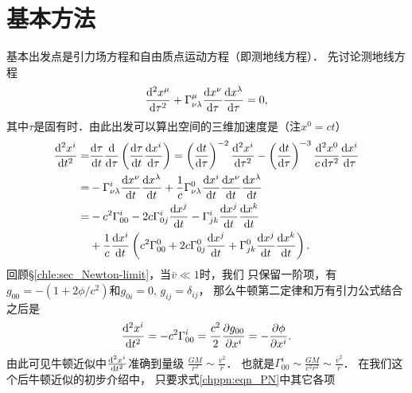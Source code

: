 \section{基本方法}
基本出发点是引力场方程和自由质点运动方程（即测地线方程）．
先讨论测地线方程
\begin{equation}
    \frac{{\rm d}^2 x^\mu}{{\rm d}\tau ^2}+ {\Gamma}_{\nu\lambda}^{\mu}
      \frac{{\rm d} x^\nu}{{\rm d}\tau} \frac{{\rm d} x^\lambda}{{\rm d}\tau} =0,
\end{equation}
其中$\tau$是固有时．由此出发可以算出空间的三维加速度是（注$x^0=ct$）
\begin{align}
    \frac{{\rm d}^2 x^i}{{\rm d} t^2} =& \frac{{\rm d} \tau}{{\rm d}t}
       \frac{{\rm d} }{{\rm d}\tau} \left( \frac{{\rm d} \tau}{{\rm d}t}
       \frac{{\rm d} x^i}{{\rm d} \tau} \right)
    =\left(\frac{{\rm d} t}{{\rm d}\tau} \right)^{-2} \frac{{\rm d}^2 x^i}{{\rm d} \tau^2}
     -\left(\frac{{\rm d} t}{{\rm d}\tau} \right)^{-3}
     \frac{{\rm d}^2 x^0}{c\, {\rm d} \tau^2} \frac{{\rm d} x^i}{{\rm d} \tau}  \notag \\
    =&-{\Gamma}_{\nu\lambda}^{i} \frac{{\rm d} x^\nu}{{\rm d}t} \frac{{\rm d} x^\lambda}{{\rm d}t}
      +\frac{1}{c} {\Gamma}_{\nu\lambda}^{0} \frac{{\rm d} x^i}{{\rm d}t}
       \frac{{\rm d} x^\nu}{{\rm d}t} \frac{{\rm d} x^\lambda}{{\rm d}t} \notag \\
    =& -c^2 \Gamma_{00}^{i} - 2c \Gamma_{0j}^{i}\frac{{\rm d} x^j}{{\rm d}t}
       -\Gamma_{jk}^{i} \frac{{\rm d} x^j}{{\rm d}t} \frac{{\rm d} x^k}{{\rm d}t} \notag \\
      & +\frac{1}{c}\frac{{\rm d} x^i}{{\rm d}t} \left(
        c^2 \Gamma_{00}^{0} + 2c \Gamma_{0j}^{0}\frac{{\rm d} x^j}{{\rm d}t}
       +\Gamma_{jk}^{0} \frac{{\rm d} x^j}{{\rm d}t}
       \frac{{\rm d} x^k}{{\rm d}t}  \right) . \label{chppn:eqn_PN}
\end{align}
回顾\S\ref{chle:sec_Newton-limit}，当$\bar{v} \ll 1$时，我们
只保留一阶项，有$g_{00}=-(1+ 2\phi/c^2)$和$g_{0i}=0,\, g_{ij}=\delta_{ij}$，
那么牛顿第二定律和万有引力公式结合之后是
\begin{equation}
    \frac{{\rm d}^2 x^i}{{\rm d}t^2}=-c^2{\Gamma}_{00}^i
    =\frac{c^2}{2} \frac{\partial g_{00}}{\partial x^i}
    =-\frac{\partial \phi}{\partial x^i} .
\end{equation}
由此可见牛顿近似中$\frac{{\rm d}^2 x^i}{{\rm d}t^2}$准确到量级
$\frac{G M}{r^2} \sim \frac{v^2}{r}$．
也就是$\Gamma_{00}^i\sim \frac{G M}{c^2 r^2} \sim \frac{\bar{v}^2}{r} $．
在我们这个后牛顿近似的初步介绍中，
只要求式\eqref{chppn:eqn_PN}中其它各项
